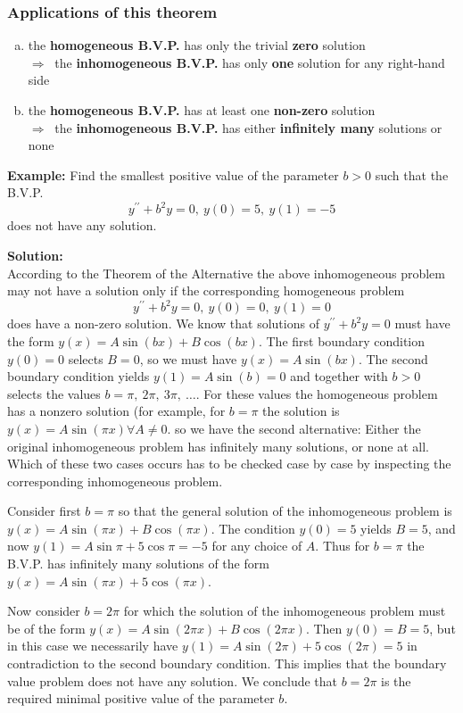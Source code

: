\documentclass[11pt,a4paper,twoside]{article}
\begin{document}
	\subsubsection{Applications of this theorem}
	\begin{enumerate}[(a)]
		\item the \textbf{homogeneous B.V.P.} has only the trivial \textbf{zero} solution\\
		$\Rightarrow\ $ the \textbf{inhomogeneous B.V.P.} has only \textbf{one} solution for any right-hand side  
		\item the \textbf{homogeneous B.V.P.} has at least one \textbf{non-zero} solution\\
		$\Rightarrow\ $ the \textbf{inhomogeneous B.V.P.} has either \textbf{infinitely many}  solutions or none
	\end{enumerate}
	\textbf{Example:}
	Find the smallest positive value of the parameter $b > 0$ such that the B.V.P. 
	$$
	y^{\prime\prime} + b^2y = 0,\ y(0) = 5,\ y(1) = -5
	$$
	does not have any solution.\par
	\textbf{Solution:}\\
	According to the Theorem of the Alternative the above inhomogeneous problem may not have a solution only if the corresponding homogeneous problem
	$$
	y^{\prime\prime} + b^2y = 0,\ y(0) = 0,\ y(1) = 0
	$$
	does have a non-zero solution. We know that solutions of $y^{\prime\prime} + b^2y = 0$ must have the form $y(x) = A \sin (bx) + B \cos (bx)$. The first boundary condition $y(0) = 0$ selects $B = 0$, so we must have $y(x) = A \sin (bx)$. The second boundary condition yields $y(1) = A \sin (b) = 0$ and together with $b > 0$ selects the values $b = \pi,\ 2\pi,\ 3\pi,\ \ldots$. For these values the homogeneous problem has a nonzero solution (for example, for $b = \pi$ the solution is $y(x) = A\sin (\pi x)\forall A \neq 0$. so we have the second alternative: Either the original inhomogeneous problem has infinitely many solutions, or none at all. Which of these two cases occurs has to be checked case by case by inspecting the corresponding inhomogeneous problem.\par
	Consider first $b = \pi$ so that the general solution of the inhomogeneous problem is $y(x) = A \sin (\pi x) + B \cos (\pi x)$. The condition $y(0) = 5$ yields $B = 5$, and now $y(1) = A \sin \pi + 5 \cos \pi = −5$ for any choice of $A$. Thus for $b = \pi$ the B.V.P. has infinitely many solutions of the form $y(x) = A \sin (\pi x) + 5 \cos (\pi x)$.\par
	Now consider $b = 2\pi$ for which the solution of the inhomogeneous problem must be of the form $y(x) = A \sin (2\pi x) + B \cos (2\pi x)$. Then $y(0) = B = 5$, but in this case we necessarily have $y(1) = A \sin (2\pi) + 5 \cos (2\pi) = 5$ in contradiction to the second boundary condition. This implies that the boundary value problem does not have any solution. We conclude that $b = 2\pi$ is the required minimal positive value of the parameter $b$.
\end{document}
